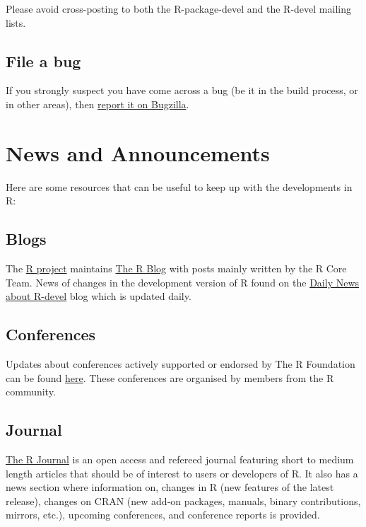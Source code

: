 \documentclass[
]{book}
\begin{document}
Please avoid cross-posting to both the R-package-devel and the R-devel mailing lists.

\section{File a bug}\label{file-a-bug}

If you strongly suspect you have come across a bug (be it in the build process, or in other areas), then \hyperref[ReportBug]{report it on Bugzilla}.

\chapter{News and Announcements}\label{News}

Here are some resources that can be useful to keep up with the developments in R:

\section{Blogs}\label{blogs}

The \href{https://www.r-project.org/}{R project} maintains \href{https://blog.r-project.org/}{The R Blog} with posts mainly written by the R Core Team. News of changes in the development version of R found on the \href{https://developer.r-project.org/blosxom.cgi/R-devel}{Daily News about R-devel} blog which is updated daily.

\section{Conferences}\label{conferences}

Updates about conferences actively supported or endorsed by The R Foundation can be found \href{https://www.r-project.org/conferences/}{here}. These conferences are organised by members from the R community.

\section{Journal}\label{journal}

\href{https://journal.r-project.org/}{The R Journal} is an open access and refereed journal featuring short to medium length articles that should be of interest to users or developers of R. It also has a news section where information on, changes in R (new features of the latest release), changes on CRAN (new add-on packages, manuals, binary contributions, mirrors, etc.), upcoming conferences, and conference reports is provided.
\end{document}
